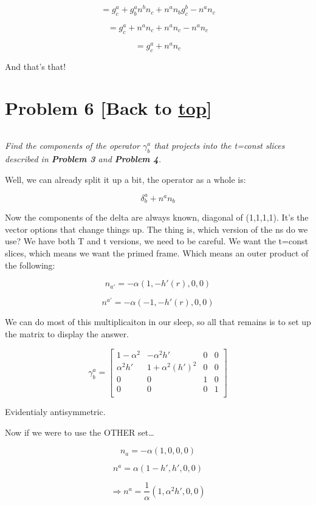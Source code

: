 \documentclass[landscape,letterpaper,10pt,english]{article}
\begin{document}
\[ = g^a_c + g^a_bn^bn_c + n^an_bg^b_c - n^an_c \]

\[ = g^a_c + n^an_c + n^an_c - n^an_c \]

\[ = g^a_c + n^an_c \]

And that's that!

    \hypertarget{problem-6-back-to-top}{%
\section{\texorpdfstring{Problem 6 {[}Back to
\hyperref[toc]{top}{]}}{Problem 6 {[}Back to {]}}}\label{problem-6-back-to-top}}

\[\label{P6}\]

\emph{Find the components of the operator \(\gamma^a_b\) that projects
into the t=const slices described in \textbf{Problem 3} and
\textbf{Problem 4}.}

Well, we can already split it up a bit, the operator as a whole is:

\[ \delta^a_b + n^an_b \]

Now the components of the delta are always known, diagonal of (1,1,1,1).
It's the vector options that change things up. The thing is, which
version of the ns do we use? We have both T and t versions, we need to
be careful. We want the t=const slices, which means we want the primed
frame. Which means an outer product of the following:

\[ n_{a'} = -\alpha(1,-h'(r),0,0)\]

\[ n^{a'} = -\alpha(-1,-h'(r),0,0)\]

    We can do most of this multiplicaiton in our sleep, so all that remains
is to set up the matrix to display the answer.

\[ \gamma^a_b = \begin{bmatrix}
1-\alpha^2 & -\alpha^2h' & 0 & 0 \\
\alpha^2h' & 1+\alpha^2(h')^2& 0 & 0 \\
0 & 0 & 1 & 0 \\
0 & 0 & 0 & 1 \\
\end{bmatrix}\]

Evidentialy antisymmetric.

Now if we were to use the OTHER set\ldots{}

\[ n_a = -\alpha(1,0,0,0) \]

\[ n^a = \alpha(1-h', h',0,0) \]

\[ \Rightarrow n^a = \frac1\alpha(1, \alpha^2h',0,0) \]
\end{document}
